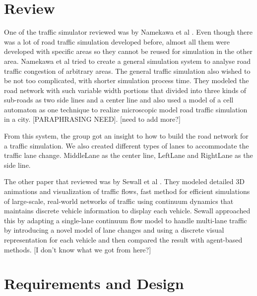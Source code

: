 \documentclass[11pt]{article}
\begin{document}
\section{Review}

One of the traffic simulator reviewed was by Namekawa et al \cite{NameUeda05}. Even though there was a lot of road traffic simulation developed before, almost all them were developed with specific areas so they cannot be reused for simulation in the other area. Namekawa et al tried to create a general simulation system to analyse road traffic congestion of arbitrary areas. The general traffic simulation also wished to be not too complicated, with shorter simulation process time. They modeled the road network with such variable width portions that divided into three kinds of sub-roads as two side lines and a center line and also used a model of a cell automaton as one technique to realize microscopic model road traffic simulation in a city. [PARAPHRASING NEED]. [need to add more?]

From this system, the group got an insight to how to build the road network for a traffic simulation.  We also created different types of lanes to accommodate the traffic lane change. MiddleLane as the center line, LeftLane and RightLane as the side line. 

The other paper that reviewed was by Sewall et al \cite{SewWilMer10}. They modeled detailed 3D animations and visualization of traffic flows, fast method for efficient simulations of large-scale, real-world networks of traffic using continuum dynamics that maintains discrete vehicle information to display each vehicle.
Sewall approached this by adapting a single-lane continuum flow model to handle multi-lane traffic by introducing a novel model of lane changes and using a discrete visual representation for each vehicle and then compared the result with agent-based methods. [I don't know what we got from here?]


\newpage
\section{Requirements and Design}
\end{document}
